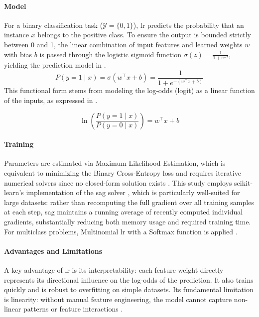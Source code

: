 \paragraph{Model} For a binary classification task ($\mathcal{Y} = \{0, 1\}$), \gls{lr} predicts the probability that an instance $x$ belongs to the positive class. To ensure the output is bounded strictly between 0 and 1, the linear combination of input features and learned weights $w$ with bias $b$ is passed through the logistic sigmoid function $\sigma(z) = \frac{1}{1 + e^{-z}}$, yielding the prediction model in .
\begin{equation}
    P(y=1 \mid x) = \sigma(w^\top x + b) = \frac{1}{1 + e^{-(w^\top x + b)}}
    \label{eq:logistic_sigmoid}
\end{equation}
This functional form stems from modeling the log-odds (logit) as a linear function of the inputs, as expressed in  \parencite{hastieElementsStatisticalLearning2017}.

\begin{equation}
    \ln\!\left(\frac{P(y=1 \mid x)}{P(y=0 \mid x)}\right) = w^\top x + b
    \label{eq:logit}
\end{equation}


\paragraph{Training} Parameters are estimated via Maximum Likelihood Estimation, which is equivalent to minimizing the Binary Cross-Entropy loss and requires iterative numerical solvers since no closed-form solution exists \parencite{hastieElementsStatisticalLearning2017}. This study employs scikit-learn's implementation of the \gls{sag} solver \parencite{pedregosaScikitlearnMachineLearning2011}, which is particularly well-suited for large datasets: rather than recomputing the full gradient over all training samples at each step, \gls{sag} maintains a running average of recently computed individual gradients, substantially reducing both memory usage and required training time. For multiclass problems, Multinomial \gls{lr} with a Softmax function is applied \parencite{hastieElementsStatisticalLearning2017}.

\paragraph{Advantages and Limitations} A key advantage of \gls{lr} is its interpretability: each feature weight directly represents its directional influence on the log-odds of the prediction. It also trains quickly and is robust to overfitting on simple datasets. Its fundamental limitation is linearity: without manual feature engineering, the model cannot capture non-linear patterns or feature interactions \parencite{hastieElementsStatisticalLearning2017}.

